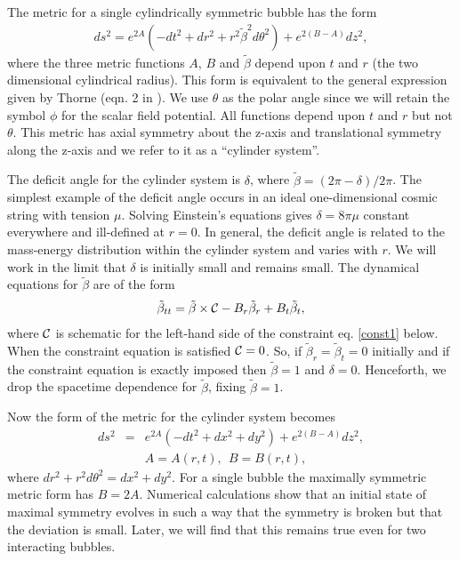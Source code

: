 \documentclass[preprintnumbers,eqsecnum,aps,prd,epsf,showpacs,nofootinbib
]{revtex4}
\begin{document}
The metric for a single cylindrically symmetric bubble has the form
\begin{eqnarray}
  ds^2 = e^{2A}\left(-dt^2+dr^2+r^2 \tilde{\beta}^2 
d\theta^2\right) +e^{2(B-A) }dz^2, 
\label{eq-metric-cylinder-system}
\end{eqnarray}
where the three metric functions $A$, $B$ and $\tilde{\beta}$ depend
upon $t$ and $r$ (the two dimensional cylindrical radius).  This form
is equivalent to the general expression given by Thorne (eqn. 2 in
\cite{Thorne65}). We use $\theta$ as the polar angle since we will
retain the symbol $\phi$ for the scalar field potential. All functions
depend upon $t$ and $r$ but not $\theta$. This metric has axial
symmetry about the z-axis and translational symmetry along the z-axis
and we refer to it as a ``cylinder system''.

The deficit angle for the cylinder system is $\delta$, where
$\tilde{\beta}=(2\pi-\delta)/2\pi$. The simplest example of the
deficit angle occurs in an ideal one-dimensional cosmic string with
tension $\mu$. Solving Einstein's equations gives $\delta = 8 \pi \mu$
constant everywhere and ill-defined at $r=0$.  In general, the deficit
angle is related to the mass-energy distribution within the cylinder
system and varies with $r$. We will work in the limit that $\delta$ is
initially small and remains small.  The dynamical equations for
$\tilde{\beta}$ are of the form
\begin{eqnarray}
  \tilde{\beta}_{tt} =
 \tilde{\beta}\times {\cal C} -B_r \tilde{\beta}_r+ 
B_t \tilde{\beta}_t, 
\label{eq-beta-dynamics}
\end{eqnarray}
where ${\cal C}$ is schematic for the left-hand side of the constraint
eq. \ref{const1} below. When the constraint equation is satisfied
${\cal C}=0$. So, if $\tilde{\beta}_r=\tilde{\beta}_t=0$ initially and
if the constraint equation is exactly imposed then $\tilde{\beta}=1$
and $\delta=0$. Henceforth, we drop the spacetime dependence for
$\tilde{\beta}$, fixing $\tilde{\beta}=1$.

Now the form of the metric for the cylinder system becomes
\begin{eqnarray}
  ds^2 &=& e^{2A}\left(-dt^2+dx^2+dy^2 \right) +e^{2(B-A) }dz^2, \\
&& A = A(r,t), ~~B = B(r,t), 
\label{eq-metric}
\end{eqnarray}
where $dr^2+r^2d\theta^2=dx^2+dy^2$. For a single bubble the maximally
symmetric metric form has $B=2A$. Numerical calculations show that an
initial state of maximal symmetry evolves in such a way that
the symmetry is broken but that the deviation is small.  Later,
we will find that this remains true even for two interacting bubbles.
\end{document}
